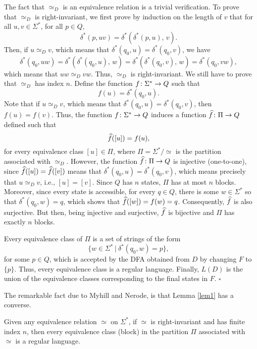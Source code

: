 \proof
The fact that $\simeq_D$ is an equivalence
relation is a trivial verification.
To prove that $\simeq_D$ is right-invariant, we first prove
by induction on the length of $v$ that for all $u, v\in\Sigma^*$,
for all $p\in Q$,
$$\delta^*(p,uv) = \delta^*(\delta^*(p,u),\, v).$$
Then, if $u\simeq_D v$, which means that
$\delta^*(q_0,u) = \delta^*(q_0,v)$,  we have
$$\delta^*(q_0,uw) = \delta^*(\delta^*(q_0,u),\, w) 
= \delta^*(\delta^*(q_0,v),\, w) = \delta^*(q_0,vw),$$
which means that $uw\simeq_D vw$.
Thus, $\simeq_D$ is right-invariant.
We still have to prove that $\simeq_D$ has index $n$.
Define the function $f\colon \Sigma^*\rightarrow Q$ such that
$$f(u) = \delta^*(q_0,u).$$
Note that if $u\simeq_D v$, which means that
$\delta^*(q_0,u) = \delta^*(q_0,v)$, then
$f(u) = f(v)$. Thus, the function $f\colon \Sigma^*\rightarrow Q$ 
induces a function $\widehat{f}\colon \Pi\rightarrow Q$
defined such that
$$\widehat{f}([u]) = f(u),$$
for every equivalence class $[u]\in \Pi$, where $\Pi = \Sigma^*/\simeq$
is the partition associated with $\simeq_D$.
However, the function $\widehat{f}\colon \Pi\rightarrow Q$ is injective
(one-to-one), since $\widehat{f}([u]) = \widehat{f}([v])$ means that
$\delta^*(q_0,u) = \delta^*(q_0,v)$, which means precisely
that $u\simeq_D v$, i.e., $[u] = [v]$.
Since $Q$ has $n$ states, $\Pi$ has at most $n$ blocks.
Moreover, since every state is accessible, for every $q\in Q$, there
is some $w\in \Sigma^*$ so that $\delta^*(q_0, w) = q$, which
shows that $\widehat{f}([w]) = f(w) = q$. Consequently, $\widehat{f}$ is
also surjective. But then, being injective and surjective, $\widehat{f}$ is
bijective and $\Pi$ has exactly $n$ blocks. 

\medskip
Every equivalence class of $\Pi$ is a set of strings of the form
$$\{w\in\Sigma^*\ |\ \delta^*(q_0, w) = p\},$$
for some $p\in Q$, which is accepted by the DFA
obtained from $D$ by changing $F$ to $\{p\}$.
Thus, every equivalence class is a regular language.
Finally, $L(D)$ is the union of the equivalence classes
corresponding to the final states in $F$.
$\square$

\medskip
The remarkable fact due to Myhill and Nerode, is that
Lemma \ref{lem1} has a converse.

\begin{lemma}
\label{lem2}
Given any equivalence relation $\simeq$ on $\Sigma^*$,
if $\simeq$ is right-invariant and has finite index $n$,
then every equivalence class (block) in the partition $\Pi$
associated with $\simeq$ is a regular language.
\end{lemma}


